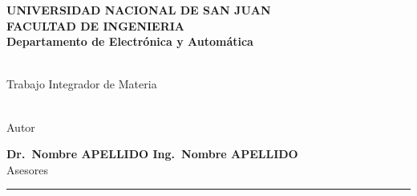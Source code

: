 \begin{titlepage}
  \begin{center}
    \begin{Large}
      \textbf{UNIVERSIDAD NACIONAL DE SAN JUAN\\
      \vspace*{0.05in}
      FACULTAD DE INGENIERIA\\
      \vspace*{0.05in}
      Departamento de Electrónica y Automática\\
      \vspace*{\fill}}
    \end{Large}
    \begin{Large}
      \textbf{\MakeUppercase{\thetitle}} \\
      Trabajo Integrador de Materia\\
    \end{Large}
    \vspace*{\fill}
    \begin{large}
      \textbf{\theauthor}\\
      Autor\\
    \end{large}
    \vspace*{0.5in}
    \begin{large}
      \textbf{Dr.~Nombre APELLIDO \hspace*{\fill}
      Ing.~Nombre APELLIDO\\}
      Asesores\\
    \end{large}
    \vspace{\fill}
    \rule{80mm}{0.1mm}\\
    \vspace{.1in}
    \the\year
  \end{center}

\end{titlepage}
